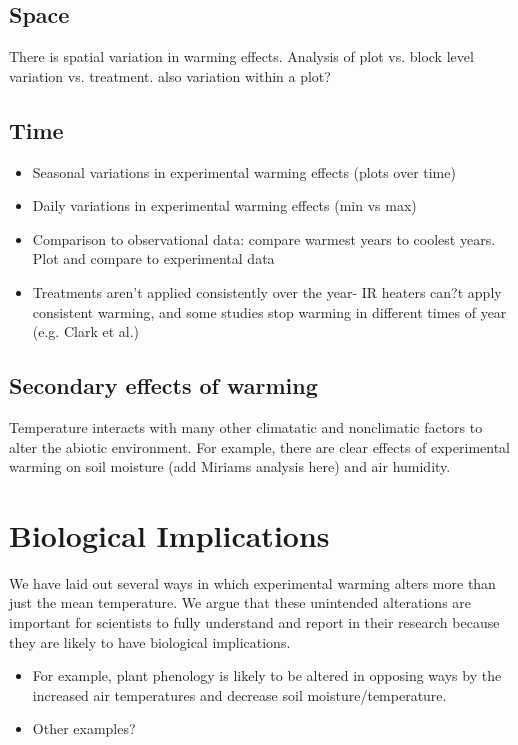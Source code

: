 \documentclass{article}
\begin{document}
\subsection{Space}
There is spatial variation in warming effects. Analysis of plot vs. block level variation vs. treatment. also variation within a plot?
\subsection{Time}
\begin{itemize}
\item Seasonal variations in experimental warming effects (plots over time)
\item Daily variations in experimental warming effects (min vs max) 
\item Comparison to observational data: compare warmest years to coolest years. Plot and compare to experimental data
\item Treatments aren't applied consistently over the year- IR heaters can?t apply consistent warming, and some studies stop warming in different times of year (e.g. Clark et al.)
\end{itemize}
\subsection {Secondary effects of warming}
Temperature interacts with many other climatatic and nonclimatic factors to alter the abiotic environment. For example, there are clear effects of experimental warming on soil moisture (add Miriams analysis here) and air humidity. 

\section {Biological Implications}
We have laid out several ways in which experimental warming alters more than just the mean temperature. We argue that these unintended alterations are important for scientists to fully understand and report in their research because they are likely to have biological implications. 
\begin{itemize}
\item For example, plant phenology is likely to be altered in opposing ways by the increased air temperatures and decrease soil moisture/temperature. 
\item Other examples?
\end{itemize}
\end{document}

